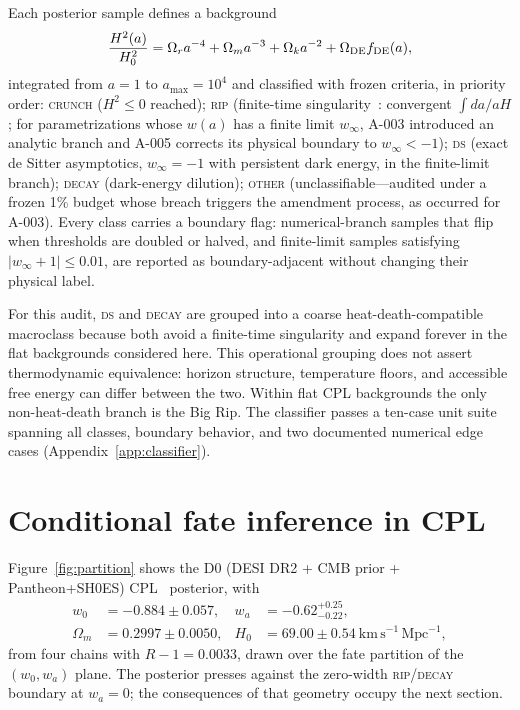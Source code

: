 \documentclass[a4paper,11pt]{article}
\newcommand{\wz}{\ensuremath{w_0}}
\newcommand{\wa}{\ensuremath{w_a}}
\begin{document}
Each posterior sample defines a background
\begin{equation}
\frac{H^2(a)}{H_0^2}=\Omega_r a^{-4}+\Omega_m a^{-3}
 +\Omega_k a^{-2}+\Omega_{\rm DE}f_{\rm DE}(a),
\end{equation}
integrated from $a=1$ to $a_{\max}=10^4$ and
classified with frozen criteria, in priority order: \textsc{crunch}
($H^2\le0$ reached); \textsc{rip} (finite-time singularity~\cite{Caldwell2003}: convergent
$\int\!da/aH$; for parametrizations whose $w(a)$ has a finite limit
$w_\infty$, A-003 introduced an analytic branch and A-005 corrects its
physical boundary to $w_\infty<-1$); \textsc{ds} (exact de Sitter
asymptotics, $w_\infty=-1$ with persistent dark energy, in the finite-limit
branch); \textsc{decay} (dark-energy
dilution); \textsc{other} (unclassifiable---audited under a frozen 1\% budget
whose breach triggers the amendment process, as occurred for A-003). Every
class carries a boundary flag: numerical-branch samples that flip when
thresholds are doubled or halved, and finite-limit samples satisfying
$|w_\infty+1|\le0.01$, are reported as boundary-adjacent without changing
their physical label.

For this audit, \textsc{ds} and \textsc{decay} are grouped into a coarse
heat-death-compatible macroclass because both avoid a finite-time singularity
and expand forever in the flat backgrounds considered here. This operational
grouping does not assert thermodynamic equivalence: horizon structure,
temperature floors, and accessible free energy can differ between the two.
Within flat CPL backgrounds the only non-heat-death branch is the Big Rip. The
classifier passes a ten-case unit suite spanning all classes, boundary
behavior, and two documented numerical edge cases
(Appendix~\ref{app:classifier}).

\section{Conditional fate inference in CPL}\label{sec:baseline}

Figure~\ref{fig:partition} shows the D0 (DESI DR2 + CMB prior + Pantheon+SH0ES)
CPL~\cite{ChevallierPolarski2001,Linder2003} posterior, with
\begin{align*}
\wz&=-0.884\pm0.057, & \wa&=-0.62^{+0.25}_{-0.22},\\
\Omega_m&=0.2997\pm0.0050, &
H_0&=69.00\pm0.54~\mathrm{km\,s^{-1}\,Mpc^{-1}},
\end{align*}
from four chains with $R-1=0.0033$, drawn over the fate partition of the
$(\wz,\wa)$ plane. The posterior presses
against the zero-width \textsc{rip}/\textsc{decay} boundary at $\wa=0$; the
consequences of that geometry occupy the next section.
\end{document}
